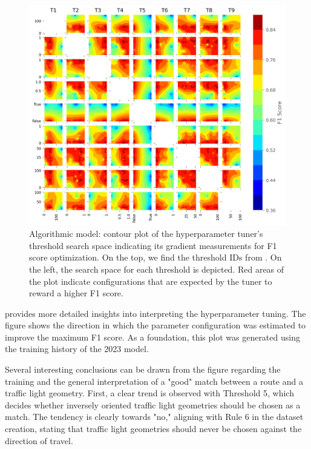 \begin{figure}[!t]
\centering 
\includegraphics[width=\linewidth]{images/matching-hpt-contour-topological-osm-updated.png}
\caption{Algorithmic model: contour plot of the hyperparameter tuner's threshold search space indicating its gradient measurements for F1 score optimization. On the top, we find the threshold IDs from . On the left, the search space for each threshold is depicted. Red areas of the plot indicate configurations that are expected by the tuner to reward a higher F1 score.}
\label{fig:hyperparameter-contourplot}
\end{figure}

 provides more detailed insights into interpreting the hyperparameter tuning. The figure shows the direction in which the parameter configuration was estimated to improve the maximum F1 score. As a foundation, this plot was generated using the training history of the 2023 model.

Several interesting conclusions can be drawn from the figure regarding the training and the general interpretation of a "good" match between a route and a traffic light geometry. First, a clear trend is observed with Threshold 5, which decides whether inversely oriented traffic light geometries should be chosen as a match. The tendency is clearly towards "no," aligning with Rule 6 in the dataset creation, stating that traffic light geometries should never be chosen against the direction of travel. 

